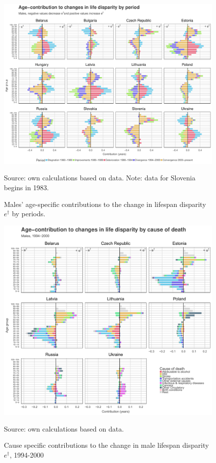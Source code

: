 \documentclass{article}
\begin{document}
\begin{figure}[h!]
\caption{Males' age-specific contributions to the change in lifespan disparity $e^\dagger$ by periods.}
\label{MalesDecomp}
\centering
\begin{center}
\includegraphics[scale=.52]{Figures/Age_ed_decomp_Males.pdf}
\end{center}
Source: own calculations based on \citet{HMD} data. Note: data for Slovenia begins in 1983.
\end{figure}

\newpage

\begin{figure}[h!]
\caption{Cause specific contributions to the change in  male lifespan disparity  $e^\dagger$, 1994-2000}
\label{Males_causes_1994}
\centering
\begin{center}
\includegraphics[scale=.53]{Figures/Cause_ed_decomp_Males_1.pdf}
\end{center}
Source: own calculations based on \citet{HMD} data. 
\end{figure}
\end{document}
